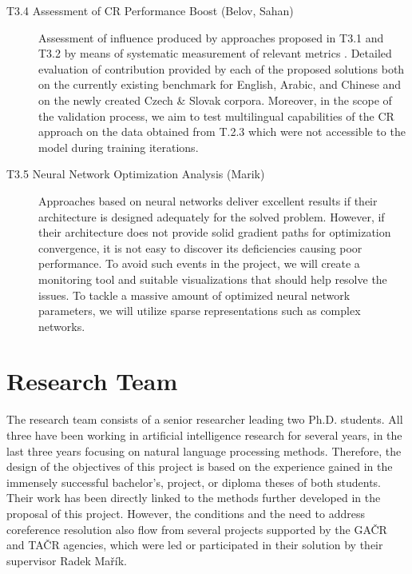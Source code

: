 \begin{description}
	\item  [T3.4 Assessment of CR Performance Boost (Belov, Sahan)]  Assessment of influence produced by approaches proposed in T3.1 and T3.2 by means of systematic measurement of relevant metrics \cite{muc-Vilain1995,b3-Bagga1998,ceaf-Luo2005}. Detailed evaluation of contribution provided by each of the proposed solutions both on the currently existing benchmark for English, Arabic, and Chinese \cite{ontonotes5-Weischedel2013} and on the newly created Czech \& Slovak corpora. Moreover, in the scope of the validation process, we aim to test multilingual capabilities of the CR approach on the data obtained from T.2.3 which were not accessible to the model during training iterations.
	
	\item [T3.5 Neural Network Optimization Analysis  (Marik)] Approaches based on neural networks deliver excellent results if their architecture is designed adequately for the solved problem. However, if their architecture does not provide solid gradient paths for optimization convergence, it is not easy to discover its deficiencies causing poor performance. To avoid such events in the project, we will create a monitoring tool and suitable visualizations that should help resolve the issues. To tackle a massive amount of optimized neural network parameters, we will utilize sparse representations such as complex networks.

\end{description}


\section{Research Team}\label{sec:research_team}

The research team consists of a senior researcher leading two Ph.D. students. All three have been working in artificial intelligence research for several years, in the last three years focusing on natural language processing methods. Therefore, the design of the objectives of this project is based on the experience gained in the immensely successful bachelor's, project, or diploma theses of both students. Their work has been directly linked to the methods further developed in the proposal of this project. However, the conditions and the need to address coreference resolution also flow from several projects supported by the GAČR and TAČR agencies, which were led or participated in their solution by their supervisor Radek Mařík.

